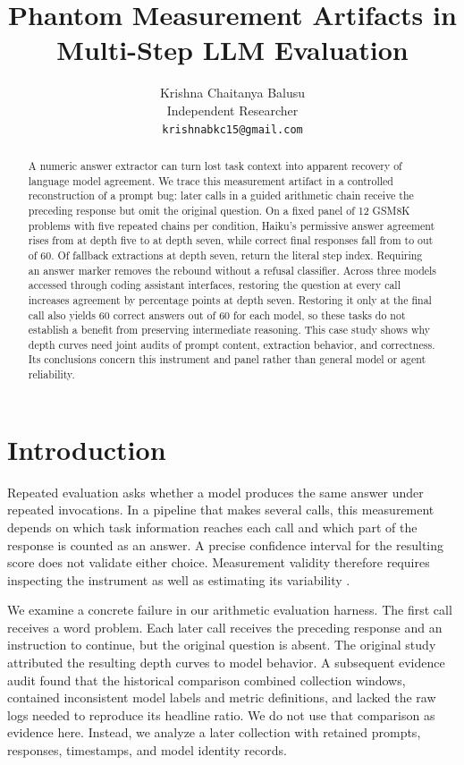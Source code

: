 \documentclass{article}
\title{Phantom Measurement Artifacts in\\Multi-Step LLM Evaluation}
\author{Krishna Chaitanya Balusu\\
Independent Researcher\\
\texttt{krishnabkc15@gmail.com}}
\begin{document}
\maketitle
{}

\begin{abstract}
A numeric answer extractor can turn lost task context into apparent recovery of language model agreement. We trace this measurement artifact in a controlled reconstruction of a prompt bug: later calls in a guided arithmetic chain receive the preceding response but omit the original question. On a fixed panel of 12 GSM8K problems with five repeated chains per condition, Haiku's permissive answer agreement rises from \HaikuDfive{} at depth five to \HaikuDseven{} at depth seven, while correct final responses fall from \HaikuAccFiveCount{} to \HaikuAccSevenCount{} out of 60. Of \FallbackCount{} fallback extractions at depth seven, \StepCount{} return the literal step index. Requiring an answer marker removes the rebound without a refusal classifier. Across three models accessed through coding assistant interfaces, restoring the question at every call increases agreement by \GapRange{} percentage points at depth seven. Restoring it only at the final call also yields 60 correct answers out of 60 for each model, so these tasks do not establish a benefit from preserving intermediate reasoning. This case study shows why depth curves need joint audits of prompt content, extraction behavior, and correctness. Its conclusions concern this instrument and panel rather than general model or agent reliability.
\end{abstract}

\section{Introduction}
\label{sec:intro}
Repeated evaluation asks whether a model produces the same answer under repeated invocations. In a pipeline that makes several calls, this measurement depends on which task information reaches each call and which part of the response is counted as an answer. A precise confidence interval for the resulting score does not validate either choice. Measurement validity therefore requires inspecting the instrument as well as estimating its variability \citep{jacobs2021measurement}.

We examine a concrete failure in our arithmetic evaluation harness. The first call receives a word problem. Each later call receives the preceding response and an instruction to continue, but the original question is absent. The original study attributed the resulting depth curves to model behavior. A subsequent evidence audit found that the historical comparison combined collection windows, contained inconsistent model labels and metric definitions, and lacked the raw logs needed to reproduce its headline ratio. We do not use that comparison as evidence here. Instead, we analyze a later collection with retained prompts, responses, timestamps, and model identity records.
\end{document}

